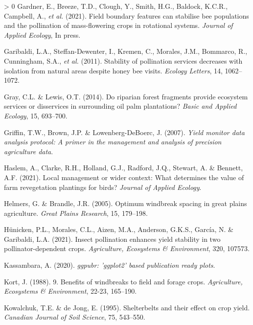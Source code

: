 \documentclass[]{elsarticle} %
\newlength{\cslhangindent}
\newenvironment{CSLReferences}[3] %
 {%
  \setlength{\parindent}{0pt}
  \ifodd #1 \everypar{\setlength{\hangindent}{\cslhangindent}}\ignorespaces\fi
  \ifnum #2 > 0
  \setlength{\parskip}{#2\baselineskip}
  \fi
 }%
 {}
\begin{document}
\begin{CSLReferences}{1}{0}
\leavevmode\hypertarget{ref-gardner2021}{}%
Gardner, E., Breeze, T.D., Clough, Y., Smith, H.G., Baldock, K.C.R., Campbell, A., \emph{et al.} (2021). Field boundary features can stabilise bee populations and the pollination of mass-flowering crops in rotational systems. \emph{Journal of Applied Ecology}, In press.

\leavevmode\hypertarget{ref-garibaldi2011}{}%
Garibaldi, L.A., Steffan-Dewenter, I., Kremen, C., Morales, J.M., Bommarco, R., Cunningham, S.A., \emph{et al.} (2011). Stability of pollination services decreases with isolation from natural areas despite honey bee visits. \emph{Ecology Letters}, 14, 1062--1072.

\leavevmode\hypertarget{ref-gray2014}{}%
Gray, C.L. \& Lewis, O.T. (2014). Do riparian forest fragments provide ecosystem services or disservices in surrounding oil palm plantations? \emph{Basic and Applied Ecology}, 15, 693--700.

\leavevmode\hypertarget{ref-griffin2007}{}%
Griffin, T.W., Brown, J.P. \& Lowenberg-DeBoerc, J. (2007). \emph{Yield monitor data analysis protocol: A primer in the management and analysis of precision agriculture data}.

\leavevmode\hypertarget{ref-haslem2021}{}%
Haslem, A., Clarke, R.H., Holland, G.J., Radford, J.Q., Stewart, A. \& Bennett, A.F. (2021). Local management or wider context: What determines the value of farm revegetation plantings for birds? \emph{Journal of Applied Ecology}.

\leavevmode\hypertarget{ref-helmers2005}{}%
Helmers, G. \& Brandle, J.R. (2005). Optimum windbreak spacing in great plains agriculture. \emph{Great Plains Research}, 15, 179--198.

\leavevmode\hypertarget{ref-hunicken2021}{}%
Hünicken, P.L., Morales, C.L., Aizen, M.A., Anderson, G.K.S., García, N. \& Garibaldi, L.A. (2021). Insect pollination enhances yield stability in two pollinator-dependent crops. \emph{Agriculture, Ecosystems {\&} Environment}, 320, 107573.

\leavevmode\hypertarget{ref-kassambara2020}{}%
Kassambara, A. (2020). \emph{{ggpubr}: 'ggplot2' based publication ready plots}.

\leavevmode\hypertarget{ref-kort1988}{}%
Kort, J. (1988). 9. Benefits of windbreaks to field and forage crops. \emph{Agriculture, Ecosystems {\&} Environment}, 22-23, 165--190.

\leavevmode\hypertarget{ref-kowalchuk1995}{}%
Kowalchuk, T.E. \& de Jong, E. (1995). Shelterbelts and their effect on crop yield. \emph{Canadian Journal of Soil Science}, 75, 543--550.


\end{CSLReferences}
\end{document}

